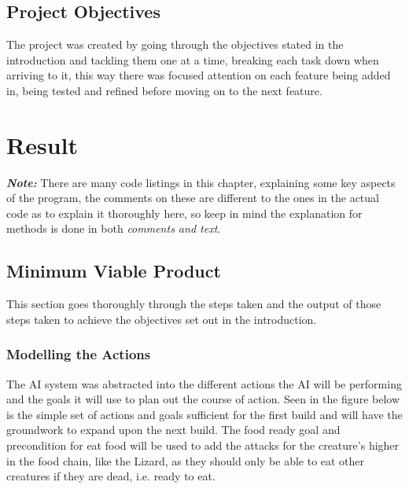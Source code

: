 \documentclass[11pt]{report}
\begin{document}
\section{Project Objectives}
The project was created by going through the objectives stated in the introduction and tackling them one at a time, breaking each task down when arriving to it, this way there was focused attention on each feature being added in, being tested and refined before moving on to the next feature.

\chapter{Result}

\textit{\textbf{Note:}} There are many code listings in this chapter, explaining some key aspects of the program, the comments on these are different to the ones in the actual code as to explain it thoroughly here, so keep in mind the explanation for methods is done in both \textit{comments and text}.

\section{Minimum Viable Product}
This section goes thoroughly through the steps taken and the output of those steps taken to achieve the objectives set out in the introduction.
\subsection{Modelling the Actions}
The AI system was abstracted into the different actions the AI will be performing and the goals it will use to plan out the course of action. Seen in the figure below is the simple set of actions and goals sufficient for the first build and will have the groundwork to expand upon the next build. The food ready goal and precondition for eat food will be used to add the attacks for the creature's higher in the food chain, like the Lizard, as they should only be able to eat other creatures if they are dead, i.e. ready to eat.
\end{document}
